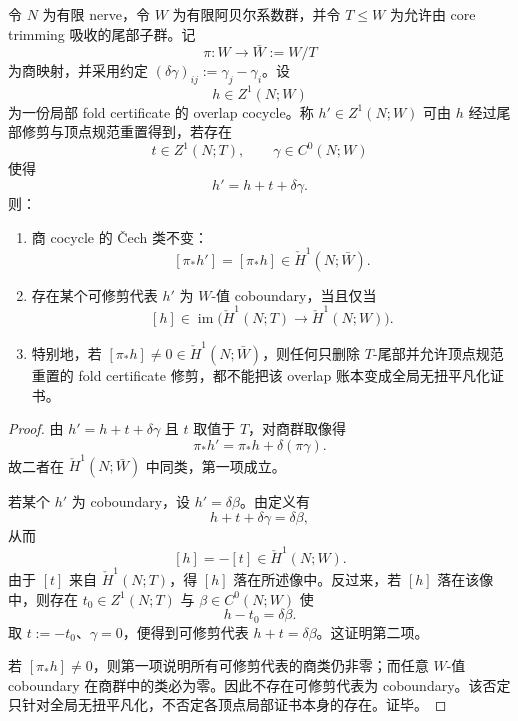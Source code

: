 \begin{proposition}\label{prop:distill-stallings-spg-fold-certificate-tail-quotient-holonomy}
令 \(N\) 为有限 nerve，令 \(W\) 为有限阿贝尔系数群，并令 \(T\le W\) 为允许由 core trimming 吸收的尾部子群。记
\[
\pi:W\longrightarrow \bar W:=W/T
\]
为商映射，并采用约定 \((\delta\gamma)_{ij}:=\gamma_j-\gamma_i\)。设
\[
h\in Z^1(N;W)
\]
为一份局部 fold certificate 的 overlap cocycle。称 \(h'\in Z^1(N;W)\) 可由 \(h\) 经过尾部修剪与顶点规范重置得到，若存在
\[
t\in Z^1(N;T),\qquad \gamma\in C^0(N;W)
\]
使得
\[
h'=h+t+\delta\gamma.
\]
则：
\begin{enumerate}
  \item 商 cocycle 的 \v Cech 类不变：
  \[
  [\pi_\ast h']=[\pi_\ast h]\in \check H^1(N;\bar W).
  \]
  \item 存在某个可修剪代表 \(h'\) 为 \(W\)-值 coboundary，当且仅当
  \[
  [h]\in \operatorname{im}\bigl(\check H^1(N;T)\to\check H^1(N;W)\bigr).
  \]
  \item 特别地，若 \([\pi_\ast h]\ne0\in\check H^1(N;\bar W)\)，则任何只删除 \(T\)-尾部并允许顶点规范重置的 fold certificate 修剪，都不能把该 overlap 账本变成全局无扭平凡化证书。
\end{enumerate}
\end{proposition}
\begin{proof}
由 \(h'=h+t+\delta\gamma\) 且 \(t\) 取值于 \(T\)，对商群取像得
\[
\pi_\ast h'=\pi_\ast h+\delta(\pi\gamma).
\]
故二者在 \(\check H^1(N;\bar W)\) 中同类，第一项成立。

若某个 \(h'\) 为 coboundary，设 \(h'=\delta\beta\)。由定义有
\[
h+t+\delta\gamma=\delta\beta,
\]
从而
\[
[h]=-[t]\in \check H^1(N;W).
\]
由于 \([t]\) 来自 \(\check H^1(N;T)\)，得 \([h]\) 落在所述像中。反过来，若 \([h]\) 落在该像中，则存在 \(t_0\in Z^1(N;T)\) 与 \(\beta\in C^0(N;W)\) 使
\[
h-t_0=\delta\beta.
\]
取 \(t:=-t_0\)、\(\gamma=0\)，便得到可修剪代表 \(h+t=\delta\beta\)。这证明第二项。

若 \([\pi_\ast h]\ne0\)，则第一项说明所有可修剪代表的商类仍非零；而任意 \(W\)-值 coboundary 在商群中的类必为零。因此不存在可修剪代表为 coboundary。该否定只针对全局无扭平凡化，不否定各顶点局部证书本身的存在。证毕。
\end{proof}
